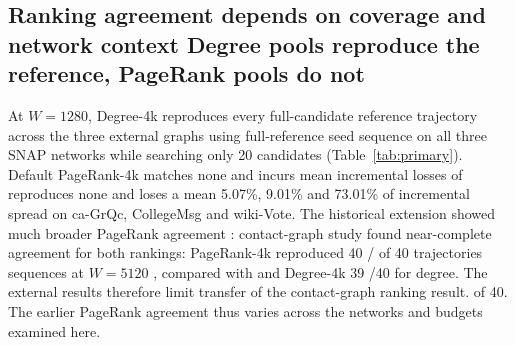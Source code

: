 \documentclass[smallextended]{svjour3}
\newcommand{\CollegePRLoss}{9.01}
\newcommand{\GrqcPRLoss}{5.07}
\newcommand{\WikiPRLoss}{73.01}
\providecommand{\DIFaddtex}[1]{{\protect\color{blue} \sf #1}} %
\providecommand{\DIFdeltex}[1]{{\protect\color{red} \scriptsize #1}} %
\providecommand{\DIFaddbegin}{} %
\providecommand{\DIFaddend}{} %
\providecommand{\DIFdelbegin}{} %
\providecommand{\DIFdelend}{} %
\providecommand{\DIFadd}[1]{\texorpdfstring{\DIFaddtex{#1}}{#1}} %
\providecommand{\DIFdel}[1]{\texorpdfstring{\DIFdeltex{#1}}{}} %
\providecommand{\DIFscaledelfig}{0.5}
\newlength{\DIFdelgraphicswidth} %
\newlength{\DIFdelgraphicsheight} %
\providecommand{\DIFaddincludegraphics}[2][]{{\color{blue}\fbox{\DIFOincludegraphics[#1]{#2}}}} %
\providecommand{\DIFdelincludegraphics}[2][]{%
\sbox{\DIFdelgraphicsbox}{\DIFOincludegraphics[#1]{#2}}%
\settoboxwidth{\DIFdelgraphicswidth}{\DIFdelgraphicsbox} %
\settoboxtotalheight{\DIFdelgraphicsheight}{\DIFdelgraphicsbox} %
\scalebox{\DIFscaledelfig}{%
\parbox[b]{\DIFdelgraphicswidth}{\usebox{\DIFdelgraphicsbox}\\[-\baselineskip] \rule{\DIFdelgraphicswidth}{0em}}\llap{\resizebox{\DIFdelgraphicswidth}{\DIFdelgraphicsheight}{%
\setlength{\unitlength}{\DIFdelgraphicswidth}%
\begin{picture}(1,1)%
\thicklines\linethickness{2pt} %
{\color[rgb]{1,0,0}\put(0,0){\framebox(1,1){}}}%
{\color[rgb]{1,0,0}\put(0,0){\line( 1,1){1}}}%
{\color[rgb]{1,0,0}\put(0,1){\line(1,-1){1}}}%
\end{picture}%
}\hspace*{3pt}}} %
} %
\DeclareRobustCommand{\DIFaddbegin}{\DIFOaddbegin \let\includegraphics\DIFaddincludegraphics} %
\DeclareRobustCommand{\DIFaddend}{\DIFOaddend \let\includegraphics\DIFOincludegraphics} %
\DeclareRobustCommand{\DIFdelbegin}{\DIFOdelbegin \let\includegraphics\DIFdelincludegraphics} %
\DeclareRobustCommand{\DIFdelend}{\DIFOaddend \let\includegraphics\DIFOincludegraphics} %
\begin{document}
\subsection{\DIFdelbegin \DIFdel{Ranking agreement depends on coverage and network context}\DIFdelend \DIFaddbegin \DIFadd{Degree pools reproduce the reference, PageRank pools do not}\DIFaddend }
At $W=1280$, Degree-4k reproduces every \DIFdelbegin \DIFdel{full-candidate reference trajectory across the three external graphs using }\DIFdelend \DIFaddbegin \DIFadd{full-reference seed sequence on all three SNAP networks while searching }\DIFaddend only 20 candidates (Table~\ref{tab:primary}). Default PageRank-4k \DIFdelbegin \DIFdel{matches none and incurs mean incremental losses of }\DIFdelend \DIFaddbegin \DIFadd{reproduces none and loses a mean }\DIFaddend \GrqcPRLoss{}\%, \CollegePRLoss{}\% and \WikiPRLoss{}\% \DIFaddbegin \DIFadd{of incremental spread }\DIFaddend on ca-GrQc, CollegeMsg and wiki-Vote. The \DIFdelbegin \DIFdel{historical extension showed much broader PageRank agreement : }\DIFdelend \DIFaddbegin \DIFadd{contact-graph study found near-complete agreement for both rankings: PageRank-4k reproduced }\DIFaddend 40 \DIFdelbegin \DIFdel{/}\DIFdelend \DIFaddbegin \DIFadd{of }\DIFaddend 40 \DIFdelbegin \DIFdel{trajectories }\DIFdelend \DIFaddbegin \DIFadd{sequences }\DIFaddend at $W=5120$ \DIFdelbegin \DIFdel{, compared with }\DIFdelend \DIFaddbegin \DIFadd{and Degree-4k }\DIFaddend 39 \DIFdelbegin \DIFdel{/40 for degree. The external results therefore limit transfer of the contact-graph ranking result.
}\DIFdelend \DIFaddbegin \DIFadd{of 40. The earlier PageRank agreement thus varies across the networks and budgets examined here.
}
\end{document}
